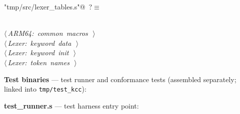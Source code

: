 \documentclass[11pt,a4paper,twoside,openright,DIV=15]{scrbook}
\theoremstyle{definition}
\theoremstyle{plain}
\theoremstyle{remark}
\begin{document}
\begin{flushleft} \small
\begin{minipage}{\linewidth}\label{scrap96}\raggedright\small
{} \verb@"tmp/src/lexer_tables.s"@\nobreak\ {\footnotesize {?}}$\equiv$
\vspace{-1ex}
\begin{list}{}{} \item
\mbox{}\verb@@\\
\mbox{}\verb@@\hbox{$\langle\,${\itshape ARM64: common macros}\nobreak\ {\footnotesize {}}$\,\rangle$}\verb@@\\
\mbox{}\verb@@\hbox{$\langle\,${\itshape Lexer: keyword data}\nobreak\ {\footnotesize {}}$\,\rangle$}\verb@@\\
\mbox{}\verb@@\hbox{$\langle\,${\itshape Lexer: keyword init}\nobreak\ {\footnotesize {}}$\,\rangle$}\verb@@\\
\mbox{}\verb@@\hbox{$\langle\,${\itshape Lexer: token names}\nobreak\ {\footnotesize {}}$\,\rangle$}\verb@@\\
\mbox{}\verb@@{\NWsep}
\end{list}
\vspace{-1.5ex}
\footnotesize
\begin{list}{}{\setlength{\itemsep}{-\parsep}\setlength{\itemindent}{-\leftmargin}}

\item{}
\end{list}
\end{minipage}\vspace{4ex}
\end{flushleft}
\bigskip
\noindent\textbf{Test binaries} --- test runner and conformance tests
(assembled separately; linked into \texttt{tmp/test\_kcc}):

\medskip
\noindent\textbf{test\_runner.s} --- test harness entry point:
\end{document}
